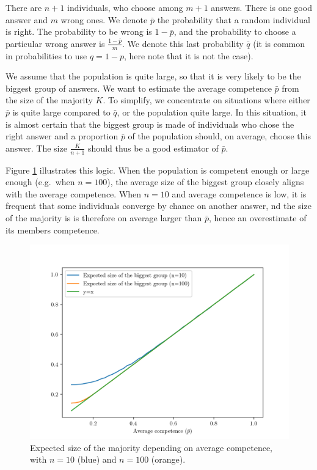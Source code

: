 \documentclass[
  doc,floatsintext]{apa6}
\begin{document}
There are \(n+1\) individuals, who choose among \(m+1\) answers. There is one good answer and \(m\) wrong ones. We denote \(\bar p\) the probability that a random individual is right. The probability to be wrong is \(1-\bar p\), and the probability to choose a particular wrong answer is \(\frac{1-\bar p}{m}\). We denote this last probability \(\bar q\) (it is common in probabilities to use \(q=1-p\), here note that it is not the case).

We assume that the population is quite large, so that it is very likely to be the biggest group of answers. We want to estimate the average competence \(\bar p\) from the size of the majority \(K\). To simplify, we concentrate on situations where either \(\bar p\) is quite large compared to \(\bar q\), or the population quite large. In this situation, it is almost certain that the biggest group is made of individuals who chose the right answer and a proportion \(\bar p\) of the population should, on average, choose this answer. The size \(\frac{K}{n+1}\) should thus be a good estimator of \(\bar p\).

Figure \ref{fig:biggestgroup} illustrates this logic. When the population is competent enough or large enough (e.g.~when \(n=100\)), the average size of the biggest group closely aligns with the average competence. When \(n=10\) and average competence is low, it is frequent that some individuals converge by chance on another answer, nd the size of the majority is is therefore on average larger than \(\bar p\), hence an overestimate of its members competence.



\begin{figure}

\includegraphics[width=0.75\linewidth]{figures/Benoit_biggest_group} \hfill{}

\caption{Expected size of the majority depending on average competence, with \(n=10\) (blue) and \(n=100\) (orange).}\label{fig:biggestgroup}
\end{figure}
\end{document}

